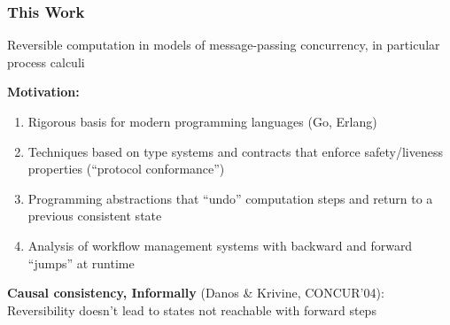 \documentclass[12pt]{beamer}
\begin{document}

\begin{frame}
\frametitle{This Work}

	Reversible computation in models of message-passing concurrency, in particular process calculi
	
	\bigskip
	
	\textbf{Motivation:}
	\begin{enumerate}[$\bullet$]
	\item Rigorous basis for modern programming languages (Go, Erlang)
	\item Techniques based on type systems and contracts that enforce safety/liveness properties (``protocol conformance'')
	\item Programming abstractions that ``undo'' computation steps and return to a previous consistent state
	\item Analysis of workflow management systems with backward and forward ``jumps'' at runtime
	\end{enumerate}	
	
	\smallskip	
	\begin{tcolorbox}[%
                  colframe=black,%
                  width=12.3cm,%
                  arc=1.5mm, auto outer arc,left=1mm,right=1mm
                 ]
	\textbf{Causal consistency, Informally} (Danos \& Krivine, CONCUR'04): \\
	Reversibility doesn't lead to states not reachable with forward steps
\end{tcolorbox}


\end{frame}

\end{document}
